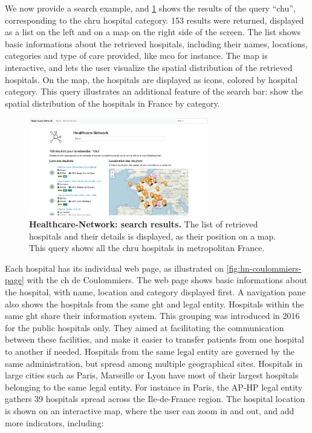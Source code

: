 We now provide a search example, and \cref{fig:hn-search} shows the results of
the query ``chu'', corresponding to the \acf{chru} hospital category. 153
results were returned, displayed as a list on the left and on a map on the right
side of the screen. The list shows basic informations about the retrieved
hospitals, including their names, locations, categories and type of care
provided, like \acf{mco} for instance. The map is interactive, and lets the user
visualize the spatial distribution of the retrieved hospitals. On the map, the
hospitals are displayed as icons, colored by hospital category. This query
illustrates an additional feature of the search bar: show the spatial distribution
of the hospitals in France by category.

\begin{figure}[h]
    \includegraphics[width=0.7\textwidth]{images/healthcare-network/search.png}
    \centering
    \caption{ \textbf{Healthcare-Network: search results.} The list of retrieved
        hospitals and their details is displayed, as their position on a map.
        This query shows all the \ac{chru} hospitals in metropolitan France. }
    \label{fig:hn-search}
\end{figure}

Each hospital has its individual web page, as illustrated on
\cref{fig:hn-coulommiers-page} with the \ac{ch} de Coulommiers. The web page
shows basic informations about the hospital, with name, location and category
displayed first. A navigation pane also shows the hospitals from the same
\ac{ght} and legal entity. Hospitals within the same \ac{ght} share their
information system. This grouping was introduced in 2016 for the public
hospitals only. They aimed at facilitating the communication between these
facilities, and make it easier to transfer patients from one hospital to another
if needed. Hospitals from the same legal entity are governed by the same
administration, but spread among multiple geographical sites. Hospitals in large
cities such as Paris, Marseille or Lyon have most of their largest hospitals
belonging to the same legal entity. For instance in Paris, the AP-HP legal entity
gathers 39 hospitals spread across the Ile-de-France region.
The hospital location is shown on an interactive map, where the user can
zoom in and out, and add more indicators, including:


